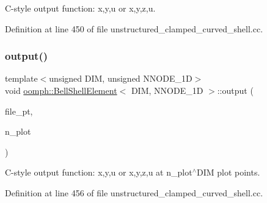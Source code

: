 C-\/style output function\+: x,y,u or x,y,z,u. 



Definition at line 450 of file unstructured\+\_\+clamped\+\_\+curved\+\_\+shell.\+cc.

\mbox{\label{classoomph_1_1BellShellElement_a6f203728a7d113a2b1029d18f7bff533}} 
\subsubsection{\texorpdfstring{output()}{output()}\hspace{0.1cm}{\footnotesize\ttfamily [4/4]}}
{\footnotesize\ttfamily template$<$unsigned D\+IM, unsigned N\+N\+O\+D\+E\+\_\+1D$>$ \\
void \hyperlink{classoomph_1_1BellShellElement}{oomph\+::\+Bell\+Shell\+Element}$<$ D\+IM, N\+N\+O\+D\+E\+\_\+1D $>$\+::output (\begin{DoxyParamCaption}\item[{F\+I\+LE $\ast$}]{file\+\_\+pt,  }\item[{const unsigned \&}]{n\+\_\+plot }\end{DoxyParamCaption})\hspace{0.3cm}{\ttfamily [inline]}}



C-\/style output function\+: x,y,u or x,y,z,u at n\+\_\+plot$^\wedge$\+D\+IM plot points. 



Definition at line 456 of file unstructured\+\_\+clamped\+\_\+curved\+\_\+shell.\+cc.

\mbox{\label{classoomph_1_1BellShellElement_aaf6d152626e653db12f0d6d3c71b0fef}} 
